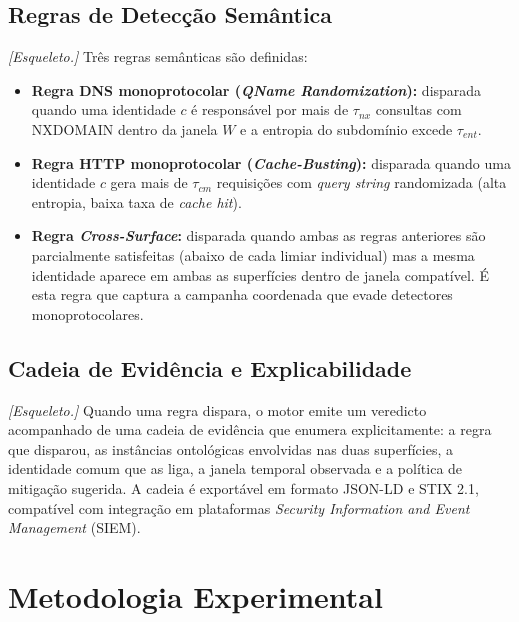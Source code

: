 \documentclass[preprint,12pt]{elsarticle}
\begin{document}
\subsection{Regras de Detecção Semântica}

\textit{[Esqueleto.]} Três regras semânticas são definidas:

\begin{itemize}
    \item \textbf{Regra DNS monoprotocolar (\emph{QName Randomization}):} disparada quando uma identidade $c$ é responsável por mais de $\tau_{nx}$ consultas com NXDOMAIN dentro da janela $W$ e a entropia do subdomínio excede $\tau_{ent}$.
    \item \textbf{Regra HTTP monoprotocolar (\emph{Cache-Busting}):} disparada quando uma identidade $c$ gera mais de $\tau_{cm}$ requisições com \emph{query string} randomizada (alta entropia, baixa taxa de \emph{cache hit}).
    \item \textbf{Regra \emph{Cross-Surface}:} disparada quando ambas as regras anteriores são parcialmente satisfeitas (abaixo de cada limiar individual) mas a mesma identidade aparece em ambas as superfícies dentro de janela compatível. É esta regra que captura a campanha coordenada que evade detectores monoprotocolares.
\end{itemize}

\subsection{Cadeia de Evidência e Explicabilidade}

\textit{[Esqueleto.]} Quando uma regra dispara, o motor emite um veredicto acompanhado de uma cadeia de evidência que enumera explicitamente: a regra que disparou, as instâncias ontológicas envolvidas nas duas superfícies, a identidade comum que as liga, a janela temporal observada e a política de mitigação sugerida. A cadeia é exportável em formato JSON-LD e STIX 2.1, compatível com integração em plataformas \emph{Security Information and Event Management} (SIEM).


\section{Metodologia Experimental}
\label{sec:experiments}
\end{document}
